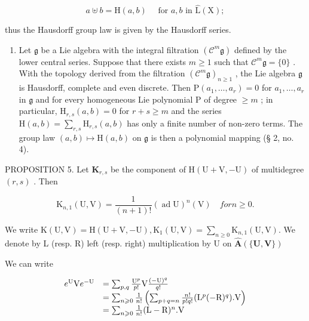 \[
a \uplus b = \mathrm{H} (a, b) \quad \text { for   } a, b \text {   in   } \hat {\mathrm{L}} (\mathrm{X});\tag{21}
\]

thus the Hausdorff group law is given by the Hausdorff series.

\begin{enumerate}
\def\labelenumi{(\arabic{enumi})}
\setcounter{enumi}{2}
\tightlist
\item
  Let \(\mathfrak{g}\) be a Lie algebra with the integral filtration \((\mathcal{C}^m\mathfrak{g})\) defined by the lower central series. Suppose that there exists \(m \geqslant 1\) such that \(\mathcal{C}^m\mathfrak{g} = \{0\}\) . With the topology derived from the filtration \((\mathcal{C}^m\mathfrak{g})_{n \geqslant 1}\) , the Lie algebra \(\mathfrak{g}\) is Hausdorff, complete and even discrete. Then \(\mathrm{P}(a_1, \ldots, a_r) = 0\) for \(a_1, \ldots, a_r\) in \(\mathfrak{g}\) and for every homogeneous Lie polynomial \(\mathrm{P}\) of degree \(\geqslant m\) ; in particular, \(\mathrm{H}_{r,s}(a, b) = 0\) for \(r + s \geqslant m\) and the series \(\mathrm{H}(a, b) = \sum_{r,s} \mathrm{H}_{r,s}(a, b)\) has only a finite number of non-zero terms. The group law \((a, b) \mapsto \mathrm{H}(a, b)\) on \(\mathfrak{g}\) is then a polynomial mapping (§ 2, no. 4).
\end{enumerate}

PROPOSITION 5. Let \(\mathbf{K}_{r,s}\) be the component of \(\mathrm{H}(\mathrm{U} + \mathrm{V}, -\mathrm{U})\) of multidegree \((r,s)\) . Then

\[
\mathrm{K} _ {n, 1} (\mathrm{U}, \mathrm{V}) = \frac {1}{(n + 1) !} (\operatorname{ad} \mathrm{U}) ^ {n} (\mathrm{V}) \quad for n \geqslant 0.
\]

We write \(\mathrm{K}(\mathrm{U},\mathrm{V}) = \mathrm{H}(\mathrm{U} + \mathrm{V}, - \mathrm{U}),\mathrm{K}_1(\mathrm{U},\mathrm{V}) = \sum_{n\geqslant 0}\mathrm{K}_{n,1}(\mathrm{U},\mathrm{V}).\) We denote by L (resp. R) left (resp. right) multiplication by U on \(\hat{\mathbf{A}} (\{\mathbf{U},\mathbf{V}\})\)

We can write

\[
\begin{array}{r l} e ^ {\mathrm{U}} \mathrm{V} e ^ {- \mathrm{U}} & = \sum_ {p, q} \frac {\mathrm{U} ^ {p}}{p !} \mathrm{V} \frac {(- \mathrm{U}) ^ {q}}{q !} \\ & = \sum_ {n \geqslant 0} \frac {1}{n !} \left(\sum_ {p + q = n} \frac {n !}{p ! q !} (\mathrm{L} ^ {p} (- \mathrm{R}) ^ {q}). \mathrm{V}\right) \\ & = \sum_ {n \geqslant 0} \frac {1}{n !} (\mathrm{L} - \mathrm{R}) ^ {n}. \mathrm{V} \end{array}
\]


